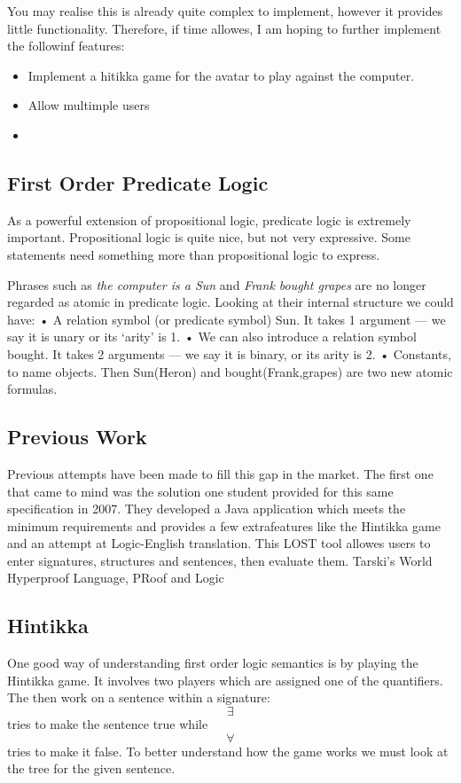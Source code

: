 \documentclass{article}
\begin{document}
You may realise this is already quite complex to implement, however it provides little functionality. Therefore, if time allowes, I am hoping to further implement the followinf features:
\begin{itemize}
	\item Implement a hitikka game for the avatar to play against the computer.
	\item Allow multimple users
	\item 


\end{itemize}

	\subsection{First Order Predicate Logic}
	As a powerful extension of propositional logic, predicate logic is extremely important. Propositional logic is quite nice, but not very expressive. Some statements need something more than propositional logic to express.

Phrases such as \emph{the computer is a Sun} and \emph{Frank bought grapes} are no longer regarded as atomic in predicate logic. Looking at their internal structure we could have:
• A relation symbol (or predicate symbol) Sun.
It takes 1 argument — we say it is unary or its ‘arity’ is 1.
• We can also introduce a relation symbol bought.
It takes 2 arguments — we say it is binary, or its arity is 2.
• Constants, to name objects.
Then Sun(Heron) and bought(Frank,grapes) are two new atomic
formulas.


	\subsection{Previous Work}
	Previous attempts have been made to fill this gap in the market. The first one that came to mind was the solution one student provided for this same specification in 2007. They developed a Java application which meets the minimum requirements and provides a few extrafeatures like the Hintikka game and an attempt at Logic-English translation. This LOST tool allowes users to enter signatures, structures and sentences, then evaluate them.
	Tarski's World
	Hyperproof
	Language, PRoof and Logic

	\subsection{Hintikka}
	One good way of understanding first order logic semantics is by playing the Hintikka game. It involves two players which are assigned one of the quantifiers. The then work on a sentence within a signature: $$\exists$$ tries to make the sentence true while $$\forall$$ tries to make it false. To better understand how the game works we must look at the tree for the given sentence. 
\end{document}
